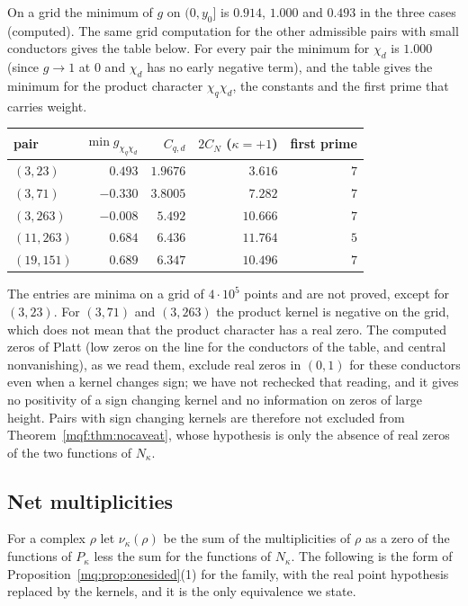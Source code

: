 On a grid the minimum of $g$ on $(0,y_0]$ is $0.914$, $1.000$ and $0.493$ in the three cases (computed). The same grid computation for the other admissible pairs with small conductors gives the table below. For every pair the minimum for $\chi_d$ is $1.000$ (since $g\to1$ at $0$ and $\chi_d$ has no early negative term), and the table gives the minimum for the product character $\chi_q\chi_d$, the constants and the first prime that carries weight.
\begin{center}
\small
\begin{tabular}{lrrrr}
\hline
pair & $\min g_{\chi_q\chi_d}$ & $C_{q,d}$ & $2C_N$ ($\kappa=+1$) & first prime\\
\hline
$(3,23)$ & $0.493$ & $1.9676$ & $3.616$ & $7$\\
$(3,71)$ & $-0.330$ & $3.8005$ & $7.282$ & $7$\\
$(3,263)$ & $-0.008$ & $5.492$ & $10.666$ & $7$\\
$(11,263)$ & $0.684$ & $6.436$ & $11.764$ & $5$\\
$(19,151)$ & $0.689$ & $6.347$ & $10.496$ & $7$\\
\hline
\end{tabular}
\end{center}
The entries are minima on a grid of $4\cdot10^5$ points and are not proved, except for $(3,23)$. For $(3,71)$ and $(3,263)$ the product kernel is negative on the grid, which does not mean that the product character has a real zero. The computed zeros of Platt \cite{Platt16} (low zeros on the line for the conductors of the table, and central nonvanishing), as we read them, exclude real zeros in $(0,1)$ for these conductors even when a kernel changes sign; we have not rechecked that reading, and it gives no positivity of a sign changing kernel and no information on zeros of large height. Pairs with sign changing kernels are therefore not excluded from Theorem~\ref{mqf:thm:nocaveat}, whose hypothesis is only the absence of real zeros of the two functions of $N_\kappa$.

\subsection{Net multiplicities}\label{mqf:sub:nocaveat}

For a complex $\rho$ let $\nu_\kappa(\rho)$ be the sum of the multiplicities of $\rho$ as a zero of the functions of $P_\kappa$ less the sum for the functions of $N_\kappa$. The following is the form of Proposition~\ref{mq:prop:onesided}(1) for the family, with the real point hypothesis replaced by the kernels, and it is the only equivalence we state.


